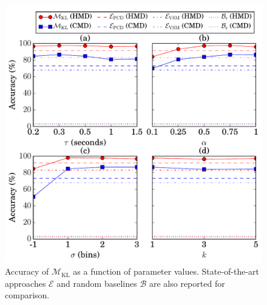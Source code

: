 \begin{figure}[t]
	\begin{center}
		\includegraphics[width=\figSizeEighty]{ch07_ragaRecognition/figures/accuracy_vs_parameters_long2.pdf}
	\end{center}\vspace{-1em}
	\caption{Accuracy of $\mathcal{M}_{\mathrm{KL}}$ as a function of parameter values. State-of-the-art approaches $\mathcal{E}$ and random baselines $\mathcal{B}$ are also reported for comparison.} 
	\label{fig:accuracy_vs_parameter_values}
\end{figure}

